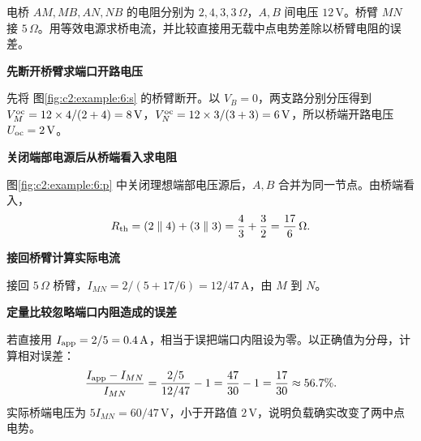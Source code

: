 \begin{question}\begin{example}[从桥臂端口作等效]\label{c2:example:6}
电桥 $AM,MB,AN,NB$ 的电阻分别为 $2,4,3,3\,\Omega$，$A,B$ 间电压 $12\,\mathrm V$。桥臂 $MN$ 接 $5\,\Omega$。用等效电源求桥电流，并比较直接用无载中点电势差除以桥臂电阻的误差。
\end{example}
\end{question}
\begin{solution}\textbf{先断开桥臂求端口开路电压}\par\nobreak
先将 图\ref{fig:c2:example:6:s} 的桥臂断开。以 $V_B=0$，两支路分别分压得到 $V_M^{\rm oc}=12\times4/(2+4)=8\,\mathrm V$，$V_N^{\rm oc}=12\times3/(3+3)=6\,\mathrm V$，所以桥端开路电压 $U_{\rm oc}=2\,\mathrm V$。



\par\medskip{}\noindent\textbf{关闭端部电源后从桥端看入求电阻}\par\nobreak
图\ref{fig:c2:example:6:p} 中关闭理想端部电压源后，$A,B$ 合并为同一节点。由桥端看入，
\[
 R_{\rm th}=(2\parallel4)+(3\parallel3)=\frac43+\frac32=\frac{17}{6}\,\Omega.
\]


\par\medskip{}\noindent\textbf{接回桥臂计算实际电流}\par\nobreak
接回 $5\,\Omega$ 桥臂，$I_{MN}=2/(5+17/6)=12/47\,\mathrm A$，由 $M$ 到 $N$。

\par\medskip{}\noindent\textbf{定量比较忽略端口内阻造成的误差}\par\nobreak
若直接用 $I_{\rm app}=2/5=0.4\,\mathrm A$，相当于误把端口内阻设为零。以正确值为分母，计算相对误差：
\[
 \frac{I_{\rm app}-I_{MN}}{I_{MN}}
 =\frac{2/5}{12/47}-1
 =\frac{47}{30}-1=\frac{17}{30}\approx56.7\%.
\]
实际桥端电压为 $5I_{MN}=60/47\,\mathrm V$，小于开路值 $2\,\mathrm V$，说明负载确实改变了两中点电势。\end{solution}
